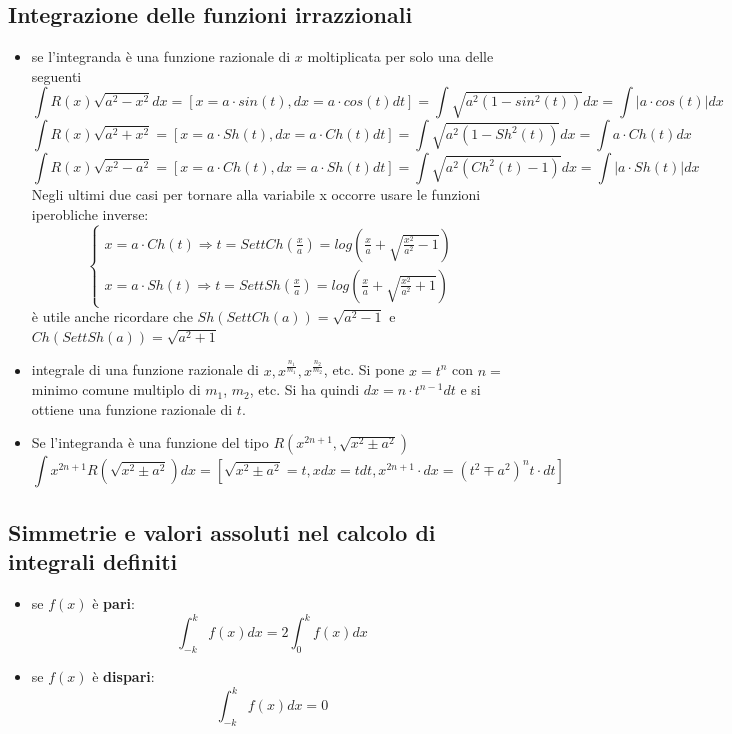 \documentclass[a4paper, 9pt]{report}
\begin{document}
\subsection*{Integrazione delle funzioni irrazzionali}
\begin{itemize}
    \item se l'integranda è una funzione razionale di $x$ moltiplicata per solo una delle seguenti
    \[
        \int R(x) \sqrt{a^2-x^2} dx = [x=a \cdot  sin(t), dx =a \cdot  cos(t)dt] = \int \sqrt{a^2(1-sin^2(t))}dx = \int|a \cdot  cos(t)|dx
    \]
    \[
        \int R(x) \sqrt{a^2 + x^2} = [x=a \cdot  Sh(t), dx =a \cdot  Ch(t)dt] = \int \sqrt{a^2(1-Sh^2(t))}dx = \int a \cdot  Ch(t)dx
    \]
    \[
        \int R(x) \sqrt{x^2 -a^2} = [x=a \cdot  Ch(t), dx =a \cdot Sh(t)dt] = \int \sqrt{a^2(Ch^2(t)-1)}dx = \int|a \cdot Sh(t)|dx
    \]
    Negli ultimi due casi per tornare alla variabile x occorre usare le funzioni iperobliche inverse:
    \[
        \begin{cases}
            x = a \cdot  Ch(t) \Rightarrow t = SettCh(\frac{x}{a}) = log\left(\frac{x}{a}+\sqrt{\frac{x^2}{a^2}-1}\right)\\
            x= a \cdot Sh(t) \Rightarrow t = SettSh\left(\frac{x}{a}\right) = log\left(\frac{x}{a}+\sqrt{\frac{x^2}{a^2}+1}\right)
        \end{cases}
    \]
    è utile anche ricordare che $Sh(SettCh(a))= \sqrt{a^2-1}$ e $Ch(SettSh(a))=\sqrt{a^2+1}$
    \item integrale di una funzione razionale di $x, x^{\frac{n_1}{m_1}}, x^{\frac{n_2}{m_2}}$, etc. \newline
    Si pone $x = t^n$ con $n=$ minimo comune multiplo di $m_1$, $m_2$, etc. Si ha quindi $dx = n \cdot  t^{n-1} dt$ e si ottiene una funzione razionale di $t$.
    \item Se l'integranda è una funzione del tipo $R(x^{2n+1}, \sqrt{x^2 \pm a^2})$
    \[
        \int x^{2n+1}R(\sqrt{x^2 \pm a^2})dx = [\sqrt{x^2 \pm a^2} = t, xdx= tdt, x^{2n+1} \cdot dx = (t^2 \mp a^2)^n t \cdot  dt]
    \]
\end{itemize}
\subsection*{Simmetrie e valori assoluti nel calcolo di integrali definiti}
\begin{itemize}
    \item se $f(x)$ è \textbf{pari}:
    \[
        \int_{-k}^{k}f(x)dx = 2 \int_{0}^{k} f(x) dx
    \]
    \item se $f(x)$ è \textbf{dispari}:
    \[
        \int_{-k}^{k}f(x)dx = 0
    \]
\end{itemize}
\end{document}
